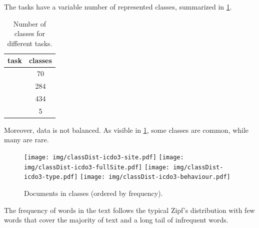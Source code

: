 

The tasks have a variable number of represented classes, summarized in
\cref{fig:numClasses}.
\begin{table}
  \center
  \caption{Number of classes for different tasks.}
  \label{fig:numClasses}
  \begin{tabular}{|l|c|}
    \hline
    task & classes \\
    \hline
    \site{} & 70 \\
    \fullSite{} & 284 \\
    \type{} & 434 \\
    \behaviour{} & 5 \\
    \hline
  \end{tabular}
\end{table}
Moreover, data is not balanced. As visible in \cref{fig:classDist},
some classes are common, while many are rare.
\begin{figure}
  \centering
  \texttt{[image: img/classDist-icdo3-site.pdf]}
  \texttt{[image: img/classDist-icdo3-fullSite.pdf]}
  \texttt{[image: img/classDist-icdo3-type.pdf]}
  \texttt{[image: img/classDist-icdo3-behaviour.pdf]}
  \caption{Documents in classes (ordered by
    frequency).}
  \label{fig:classDist}
\end{figure}

The frequency of words in the text
follows the typical Zipf's distribution with few words that cover the
majority of text and a long tail of infrequent words.


